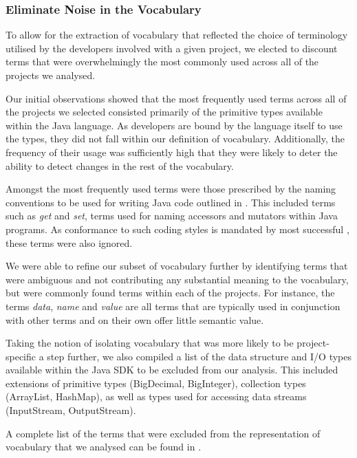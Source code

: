 
\subsubsection{Eliminate Noise in the Vocabulary} %
\label{ssub:eliminate_noise_in_the_vocabulary}

To allow for the extraction of vocabulary that reflected the choice of terminology utilised by the developers involved with a given project, we elected to discount terms that were overwhelmingly the most commonly used across all of the projects we analysed.

Our initial observations showed that the most frequently used terms across all of the projects we selected consisted primarily of the primitive types available within the Java language. As developers are bound by the language itself to use the types, they did not fall within our definition of vocabulary. Additionally, the frequency of their usage was sufficiently high that they were likely to deter the ability to detect changes in the rest of the vocabulary.

Amongst the most frequently used terms were those prescribed by the naming conventions to be used for writing Java code outlined in \cite{Reddy00a}. This included terms such as \emph{get} and \emph{set}, terms used for naming accessors and mutators within Java programs. As conformance to such coding styles is mandated by most successful \OSYS, these terms were also ignored.

We were able to refine our subset of vocabulary further by identifying terms that were ambiguous and not contributing any substantial meaning to the vocabulary, but were commonly found terms within each of the projects. For instance, the terms \emph{data}, \emph{name} and \emph{value} are all terms that are typically used in conjunction with other terms and on their own offer little semantic value.

Taking the notion of isolating vocabulary that was more likely to be project-specific a step further, we also compiled a list of the data structure and I/O types available within the Java SDK to be excluded from our analysis. This included extensions of primitive types (\eg BigDecimal, BigInteger), collection types (\eg ArrayList, HashMap), as well as types used for accessing data streams (\eg InputStream, OutputStream).

A complete list of the terms that were excluded from the representation of vocabulary that we analysed can be found in .

